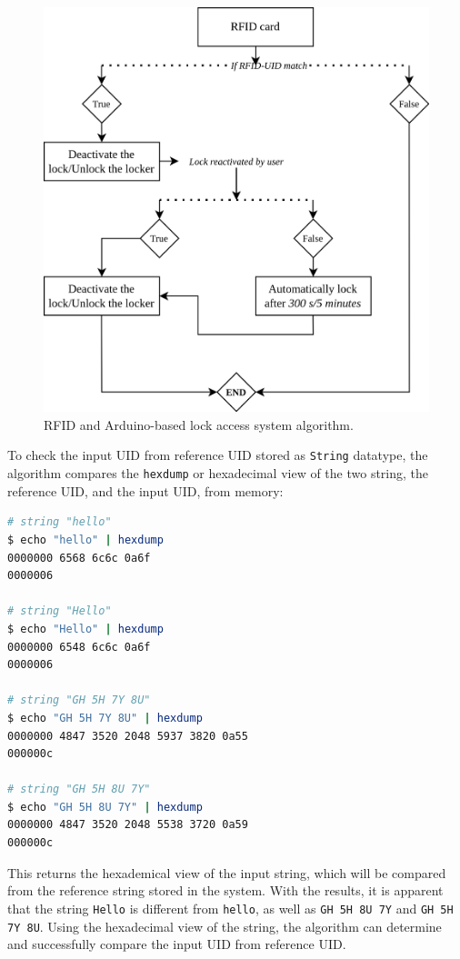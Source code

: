 \documentclass[12pt]{article}
\begin{document}
\begin{figure}[h!]
	\centering
	\includegraphics{fig_locker.png}
	\caption{RFID and Arduino-based lock access system algorithm.}
\end{figure}

To check the input UID from reference UID stored as \texttt{String} datatype, the algorithm compares the \texttt{hexdump} or hexadecimal view of the two string, the reference UID, and the input UID, from memory:

\singlespacing
\begin{lstlisting}[language=bash, caption={Example of hexadecimal view of various strings}]
# string "hello"
$ echo "hello" | hexdump
0000000 6568 6c6c 0a6f                         
0000006

# string "Hello"
$ echo "Hello" | hexdump
0000000 6548 6c6c 0a6f                         
0000006

# string "GH 5H 7Y 8U"
$ echo "GH 5H 7Y 8U" | hexdump
0000000 4847 3520 2048 5937 3820 0a55          
000000c

# string "GH 5H 8U 7Y"
$ echo "GH 5H 8U 7Y" | hexdump
0000000 4847 3520 2048 5538 3720 0a59          
000000c
\end{lstlisting} 
\doublespacing

This returns the hexademical view of the input string, which will be compared from the reference string stored in the system. With the results, it is apparent that the string \texttt{Hello} is different from \texttt{hello}, as well as \texttt{GH 5H 8U 7Y} and \texttt{GH 5H 7Y 8U}. Using the hexadecimal view of the string, the algorithm can determine and successfully compare the input UID from reference UID.
\end{document}
